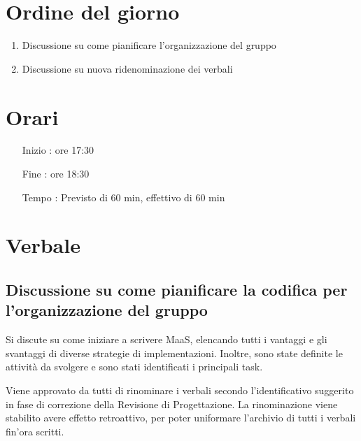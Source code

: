\documentclass[11pt]{meetingmins}
\begin{document}
\maketitle

\section{Ordine del giorno}

\begin{enumerate}

\item Discussione su come pianificare l'organizzazione del gruppo

\item Discussione su nuova ridenominazione dei verbali

\end{enumerate}

\section{Orari}

\begin{itemize}
\item[Inizio]: ore 17:30
\item[Fine]: ore 18:30
\item[Tempo]: Previsto di 60 min, effettivo di 60 min

\end{itemize}

\section{Verbale}

\subsection{Discussione su come pianificare la codifica per l'organizzazione del gruppo}

Si discute su come iniziare a scrivere MaaS, elencando tutti i vantaggi e gli svantaggi di diverse strategie di implementazioni. Inoltre, sono state definite le attività da svolgere e sono stati identificati i principali task.


Viene approvato da tutti di rinominare i verbali secondo l'identificativo suggerito in fase di correzione della Revisione di Progettazione. La rinominazione viene stabilito avere effetto retroattivo, per poter uniformare l'archivio di tutti i verbali fin'ora scritti.

\end{document}
